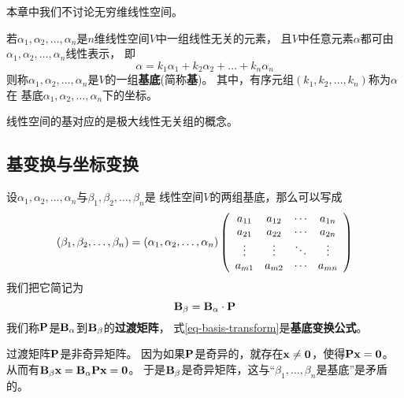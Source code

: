 \begin{remark}
  本章中我们不讨论无穷维线性空间。
\end{remark}

\begin{definition}[基与坐标]
  若$\alpha_1,\alpha_2,\dots,\alpha_n$是$n$维线性空间$V$中一组线性无关的元素，
  且$V$中任意元素$\alpha$都可由$\alpha_1,\alpha_2,\dots,\alpha_n$线性表示，
  即\[ \alpha = k_1\alpha_1 + k_2\alpha_2 + \dots + k_n\alpha_n \]
  则称$\alpha_1,\alpha_2,\dots,\alpha_n$是$V$的一组\textbf{基底}(简称\textbf{基})。
  其中，有序元组$(k_1,k_2,\dots,k_n)$称为$\alpha$在
  基底$\alpha_1,\alpha_2,\dots,\alpha_n$下的坐标。
\end{definition}

\begin{remark}
  线性空间的基对应的是极大线性无关组的概念。
\end{remark}

\subsection{基变换与坐标变换}
\begin{theorem}[基底变换公式]
  设$\alpha_1,\alpha_2,\dots,\alpha_n$与$\beta_1,\beta_2,\dots,\beta_n$是
  线性空间$V$的两组基底，那么可以写成
  \begin{equation} \label{eq-basis-transform}
    (\beta_1,\beta_2,\dots,\beta_n) = (\alpha_1,\alpha_2,\dots,\alpha_n)
    \mmat{cccc}{
      a_{11} & a_{12} & \cdots & a_{1n} \\
      a_{21} & a_{22} & \cdots & a_{2n} \\
      \vdots & \vdots & \ddots & \vdots \\
      a_{m1} & a_{m2} & \cdots & a_{mn} }
  \end{equation}
  我们把它简记为
  \begin{displaymath}
    \mmBasis{\beta} = \mmBasis{\alpha}\cdot\mmP
  \end{displaymath}
  我们称$\mmP$是$\mmBasis{\alpha}$到$\mmBasis{\beta}$的\textbf{过渡矩阵}，
  式\ref{eq-basis-transform}是\textbf{基底变换公式}。
\end{theorem}

\begin{remark}
  过渡矩阵$\mmP$是非奇异矩阵。
  因为如果$\mmP$是奇异的，就存在$\mvx\neq\mvZero$，使得$\mmP\mvx=\mvZero$。
  从而有$\mmBasis{\beta}\mvx = \mmBasis{\alpha}\mmP\mvx = \mvZero$。
  于是$\mmBasis{\beta}$是奇异矩阵，这与``$\beta_1,\dots,\beta_n$是基底''是矛盾的。
\end{remark}

